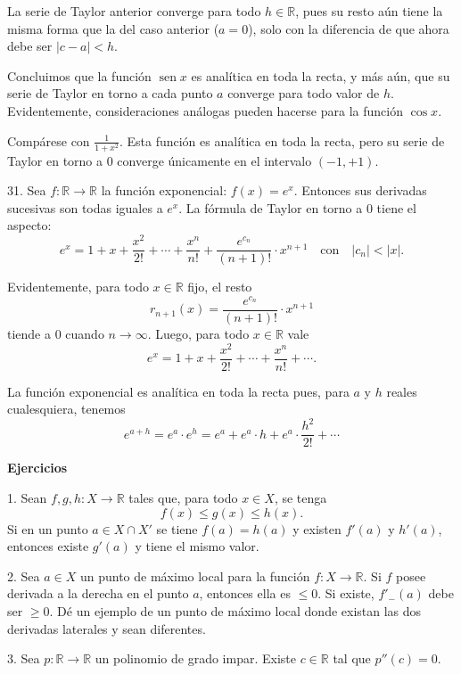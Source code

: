 \documentclass[12pt,oneside]{book}
\begin{document}
La serie de Taylor anterior converge para todo \( h \in \mathbb{R} \), pues su resto aún tiene la misma forma que la del caso anterior (\( a = 0 \)), solo con la diferencia de que ahora debe ser \( |c - a| < h \).

Concluimos que la función \( \operatorname{sen} x \) es analítica en toda la recta, y más aún, que su serie de Taylor en torno a cada punto \( a \) converge para todo valor de \( h \). Evidentemente, consideraciones análogas pueden hacerse para la función \( \cos x \).

Compárese con \( \frac{1}{1+x^2} \). Esta función es analítica en toda la recta, pero su serie de Taylor en torno a \( 0 \) converge únicamente en el intervalo \( (-1, +1) \).

31. Sea \( f: \mathbb{R} \to \mathbb{R} \) la función exponencial: \( f(x) = e^x \). Entonces sus derivadas sucesivas son todas iguales a \( e^x \). La fórmula de Taylor en torno a \( 0 \) tiene el aspecto:
\[
e^x = 1 + x + \frac{x^2}{2!} + \cdots + \frac{x^n}{n!} + \frac{e^{c_n}}{(n+1)!} \cdot x^{n+1} \quad \text{con} \quad |c_n| < |x|.
\]

Evidentemente, para todo \( x \in \mathbb{R} \) fijo, el resto
\[
r_{n+1}(x) = \frac{e^{c_n}}{(n+1)!} \cdot x^{n+1}
\]
tiende a \( 0 \) cuando \( n \to \infty \). Luego, para todo \( x \in \mathbb{R} \) vale
\[
e^x = 1 + x + \frac{x^2}{2!} + \cdots + \frac{x^n}{n!} + \cdots.
\]

La función exponencial es analítica en toda la recta pues, para \( a \) y \( h \) reales cualesquiera, tenemos
\[
e^{a+h} = e^a \cdot e^h = e^a + e^a \cdot h + e^a \cdot \frac{h^2}{2!} + \cdots
\]

\textbf{Ejercicios}

1. Sean \( f, g, h: X \to \mathbb{R} \) tales que, para todo \( x \in X \), se tenga
\[
f(x) \leq g(x) \leq h(x).
\]
Si en un punto \( a \in X \cap X' \) se tiene \( f(a) = h(a) \) y existen \( f'(a) \) y \( h'(a) \), entonces existe \( g'(a) \) y tiene el mismo valor.

2. Sea \( a \in X \) un punto de máximo local para la función \( f: X \to \mathbb{R} \). Si \( f \) posee derivada a la derecha en el punto \( a \), entonces ella es \( \leq 0 \). Si existe, \( f'_-(a) \) debe ser \( \geq 0 \). Dé un ejemplo de un punto de máximo local donde existan las dos derivadas laterales y sean diferentes.

3. Sea \( p: \mathbb{R} \to \mathbb{R} \) un polinomio de grado impar. Existe \( c \in \mathbb{R} \) tal que \( p''(c) = 0 \).
\end{document}
